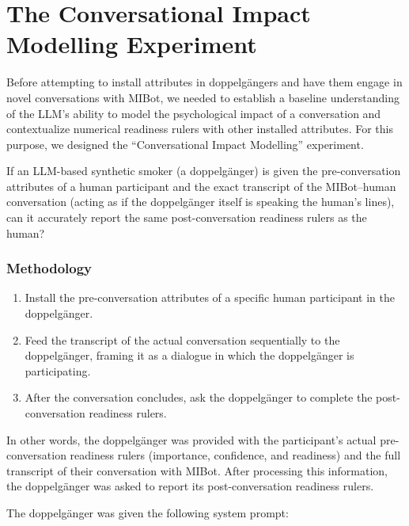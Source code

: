 \section{The Conversational Impact Modelling Experiment}
\label{sec:transcript-autoplay}

Before attempting to install attributes in doppelgängers and have them engage in novel conversations with MIBot, we needed to establish a baseline understanding of the LLM's ability to model the psychological impact of a conversation and contextualize numerical readiness rulers with other installed attributes. For this purpose, we designed the ``Conversational Impact Modelling'' experiment.

If an LLM-based synthetic smoker (a doppelgänger) is given the pre-conversation attributes of a human participant and the exact transcript of the MIBot--human conversation (acting as if the doppelgänger itself is speaking the human's lines), can it accurately report the same post-conversation readiness rulers as the human?

\subsubsection{Methodology}
\begin{enumerate}
    \item Install the pre-conversation attributes of a specific human participant in the doppelgänger.
    \item Feed the transcript of the actual conversation sequentially to the doppelgänger, framing it as a dialogue in which the doppelgänger is participating.
    \item After the conversation concludes, ask the doppelgänger to complete the post-conversation readiness rulers.
\end{enumerate}

In other words, the doppelgänger was provided with the participant's actual pre-conversation readiness rulers (importance, confidence, and readiness) and the full transcript of their conversation with MIBot. After processing this information, the doppelgänger was asked to report its post-conversation readiness rulers.

The doppelgänger was given the following system prompt:


